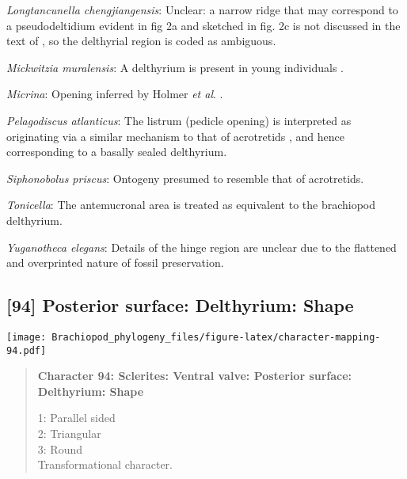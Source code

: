 \documentclass[openany]{book}
\theoremstyle{definition}
\theoremstyle{definition}
\theoremstyle{definition}
\theoremstyle{remark}
\begin{document}
\hypertarget{Longtancunella_chengjiangensis-coding-93}{}
\emph{Longtancunella chengjiangensis}: Unclear: a narrow ridge that may
correspond to a pseudodeltidium evident in fig 2a and sketched in fig.
2c is not discussed in the text of \citet{Zhang2011Theexceptionally}, so
the delthyrial region is coded as ambiguous.

\hypertarget{Mickwitzia_muralensis-coding-93}{}
\emph{Mickwitzia muralensis}: A delthyrium is present in young
individuals \citep{Balthasar2004Shellstructure}.

\hypertarget{Micrina-coding-93}{}
\emph{Micrina}: Opening inferred by Holmer \emph{et al}.
\citeyearpar{Holmer2008TheEarly}.

\hypertarget{Pelagodiscus_atlanticus-coding-93}{}
\emph{Pelagodiscus atlanticus}: The listrum (pedicle opening) is
interpreted as originating via a similar mechanism to that of
acrotretids \citep{Popov1992TheCambrian}, and hence corresponding to a
basally sealed delthyrium.

\hypertarget{Siphonobolus_priscus-coding-93}{}
\emph{Siphonobolus priscus}: Ontogeny presumed to resemble that of
acrotretids.

\hypertarget{Tonicella-coding-93}{}
\emph{Tonicella}: The antemucronal area \citep{Schwabe2010} is treated
as equivalent to the brachiopod delthyrium.

\hypertarget{Yuganotheca_elegans-coding-93}{}
\emph{Yuganotheca elegans}: Details of the hinge region are unclear due
to the flattened and overprinted nature of fossil preservation.

\subsection*{{[}94{]} Posterior surface: Delthyrium:
Shape}\label{posterior-surface-delthyrium-shape}

\texttt{[image: Brachiopod\_phylogeny\_files/figure-latex/character-mapping-94.pdf]}

\begin{quote}
\textbf{Character 94: Sclerites: Ventral valve: Posterior surface:
Delthyrium: Shape}

1: Parallel sided\\
2: Triangular\\
3: Round\\
Transformational character.
\end{quote}
\end{document}
